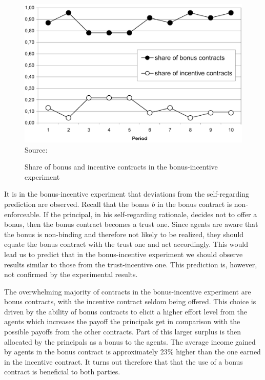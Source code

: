 \documentclass[12pt]{article}
\begin{document}
\begin{figure}[H]
	\centering
	\caption{Share of bonus and incentive contracts in the bonus-incentive experiment}	
	\includegraphics[width=1.\textwidth]{bonusincentive.png}
	 Source: \cite{fehr2007fairness}
	\label{fig:bonusincentive}
\end{figure}


It is in the bonus-incentive experiment that deviations from the self-regarding prediction are observed. Recall that the bonus $b$ in the bonus contract is non-enforceable. If the principal, in his self-regarding rationale, decides not to offer a bonus, then the bonus contract becomes a trust one. Since agents are aware that the bonus is non-binding and therefore not likely to be realized, they should equate the bonus contract with the trust one and act accordingly. This would lead us to predict that in the bonus-incentive experiment we should observe results similar to those from the trust-incentive one. This prediction is, however, not confirmed by the experimental results.



The overwhelming majority of contracts in the bonus-incentive experiment are bonus contracts, with the incentive contract seldom being offered. This choice is driven by the ability of bonus contracts to elicit a higher effort level from the agents which increases the payoff the principals get in comparison with the possible payoffs from the other contracts. Part of this larger surplus is then allocated by the principals as a bonus to the agents. The average income gained by agents in the bonus contract is approximately 23\% higher than the one earned in the incentive contract. It turns out therefore that that the use of a bonus contract is beneficial to both parties.
\end{document}
